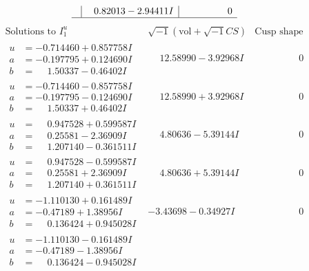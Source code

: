 \documentclass[1p]{elsarticle_modified}
\theoremstyle{definition}
\newcommand{\I}{\sqrt{-1}}
\begin{document}
$$\begin{array}{c|c|c}
 & \phantom{-}0.82013 - 2.94411 I & \phantom{-0.000000 } 0\\
 \hline 
 \end{array}$$\newpage$$\begin{array}{c|c|c}  
\text{Solutions to }I^u_{1}& \I (\text{vol} + \sqrt{-1}CS) & \text{Cusp shape}\\
 \hline 
\begin{aligned}
u &= -0.714460 + 0.857758 I \\
a &= -0.197795 + 0.124690 I \\
b &= \phantom{-}1.50337 - 0.46402 I\end{aligned}
 & \phantom{-}12.58990 - 3.92968 I & \phantom{-0.000000 } 0 \\ \hline\begin{aligned}
u &= -0.714460 - 0.857758 I \\
a &= -0.197795 - 0.124690 I \\
b &= \phantom{-}1.50337 + 0.46402 I\end{aligned}
 & \phantom{-}12.58990 + 3.92968 I & \phantom{-0.000000 } 0 \\ \hline\begin{aligned}
u &= \phantom{-}0.947528 + 0.599587 I \\
a &= \phantom{-}0.25581 - 2.36909 I \\
b &= \phantom{-}1.207140 - 0.361511 I\end{aligned}
 & \phantom{-}4.80636 - 5.39144 I & \phantom{-0.000000 } 0 \\ \hline\begin{aligned}
u &= \phantom{-}0.947528 - 0.599587 I \\
a &= \phantom{-}0.25581 + 2.36909 I \\
b &= \phantom{-}1.207140 + 0.361511 I\end{aligned}
 & \phantom{-}4.80636 + 5.39144 I & \phantom{-0.000000 } 0 \\ \hline\begin{aligned}
u &= -1.110130 + 0.161489 I \\
a &= -0.47189 + 1.38956 I \\
b &= \phantom{-}0.136424 + 0.945028 I\end{aligned}
 & -3.43698 - 0.34927 I & \phantom{-0.000000 } 0 \\ \hline\begin{aligned}
u &= -1.110130 - 0.161489 I \\
a &= -0.47189 - 1.38956 I \\
b &= \phantom{-}0.136424 - 0.945028 I\end{aligned}

\end{array}$$
\end{document}
